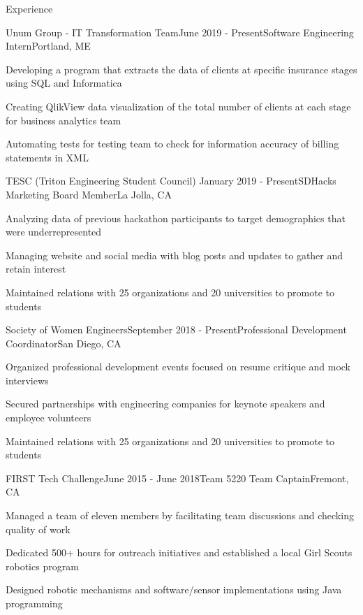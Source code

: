 \documentclass{resume} %
\begin{document}
\begin{rSection}{\faCode{ }}{Experience}

\begin{rSubsection}{}{Unum Group - IT Transformation Team}{June 2019 - Present}{Software Engineering Intern}{Portland, ME}
\item Developing a program that extracts the data of clients at specific insurance stages using SQL and Informatica
\item Creating QlikView data visualization of the total number of clients at each stage for business analytics team
\item Automating tests for testing team to check for information accuracy of billing statements in XML 
\end{rSubsection}

\begin{rSubsection}{}{TESC (Triton Engineering Student Council) }{January 2019 - Present}{SDHacks Marketing Board Member}{La Jolla, CA}
\item Analyzing data of previous hackathon participants to target demographics that were underrepresented
\item Managing website and social media with blog posts and updates to gather and retain interest
\item Maintained relations with 25 organizations and 20 universities to promote to students
\end{rSubsection}

\begin{rSubsection}{}{Society of Women Engineers}{September 2018 - Present}{Professional Development Coordinator}{San Diego, CA}
\item Organized professional development events focused on resume critique and mock interviews
\item Secured partnerships with engineering companies for keynote speakers and employee volunteers
\item Maintained relations with 25 organizations and 20 universities to promote to students
\end{rSubsection}



\begin{rSubsection}{}{FIRST Tech Challenge}{June 2015 - June 2018}{Team 5220 Team Captain}{Fremont, CA}
\item Managed a team of eleven members by facilitating team discussions and checking quality of work
\item Dedicated 500+ hours for outreach initiatives and established a local Girl Scouts robotics program
\item Designed robotic mechanisms and software/sensor implementations using Java programming
\end{rSubsection}

\end{rSection}
\end{document}
